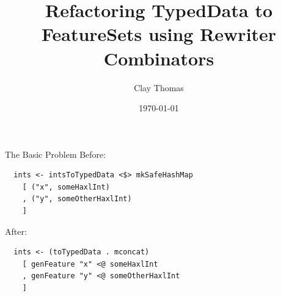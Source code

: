 \documentclass{beamer}
\title{Refactoring TypedData to FeatureSets using Rewriter Combinators}
\author{Clay Thomas}
\date{\today}
\begin{document}
  \begin{frame}
    \titlepage
  \end{frame}

  \begin{frame}[fragile]{The Basic Problem}
    Before:
\begin{verbatim}
  ints <- intsToTypedData <$> mkSafeHashMap
    [ ("x", someHaxlInt)
    , ("y", someOtherHaxlInt)
    ]
\end{verbatim}

    After:
\begin{verbatim}
  ints <- (toTypedData . mconcat)
    [ genFeature "x" <@ someHaxlInt
    , genFeature "y" <@ someOtherHaxlInt
    ]
\end{verbatim}
    
  \end{frame}
\end{document}
